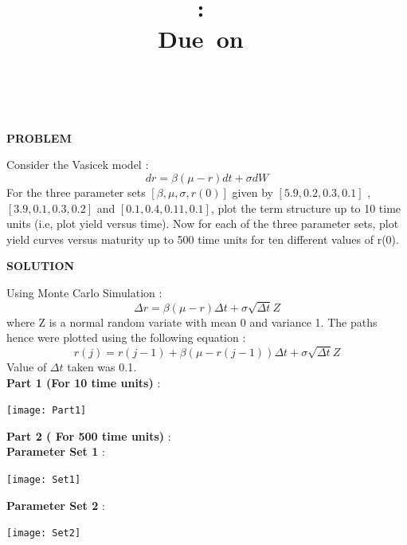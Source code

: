 \documentclass{article}
\title{
\vspace{2in}
\textmd{\textbf{\hmwkClass:\ \hmwkTitle}}\\
\normalsize\vspace{0.1in}\small{Due\ on\ \hmwkDueDate}\\
\vspace{0.1in}\large{\textit{\hmwkClassInstructor\ \hmwkClassTime}}
\vspace{3in}
}
\author{\textbf{\hmwkAuthorName}}
\date{} %
\begin{document}
\maketitle



\newpage

\begin{center}
\textbf{PROBLEM}
\end{center}

Consider the Vasicek model :
$$dr = \beta(\mu - r)dt + \sigma dW$$
For the three parameter sets $[\beta , \mu , \sigma , r(0)]$ given by $[5.9 , 0.2 , 0.3 , 0.1]$ , $[3.9 , 0.1 , 0.3 , 0.2]$ and
$[0.1 , 0.4 , 0.11 , 0.1]$, plot the term structure up to 10 time units (i.e, plot yield versus time). Now for each of
the three parameter sets, plot yield curves versus maturity up to 500 time units for ten different values of r(0).

\begin{center}
\textbf{SOLUTION}
\end{center}
Using Monte Carlo Simulation :\\
$$\Delta r  = \beta ( \mu - r )\Delta t + \sigma \sqrt{\Delta t}Z$$
 where Z is a  normal random variate with mean 0 and variance 1.
 The paths hence were plotted using the following equation :\\
 $$r(j) = r(j-1) + \beta ( \mu - r(j-1) )\Delta t  + \sigma \sqrt{\Delta t}Z$$
 Value of $\Delta t$ taken was 0.1.\\
 
 \textbf{Part 1 (For 10 time units)}  :
 \begin{center}
 \texttt{[image: Part1]}
 \end{center}
 
 \textbf{Part 2 ( For 500 time units)} :\\
 \textbf{Parameter Set 1} :
 \begin{center}
 \texttt{[image: Set1]}
 \end{center}
 
 \textbf{Parameter Set 2} :
 \begin{center}
 \texttt{[image: Set2]}
 \end{center}
 
\end{document}
